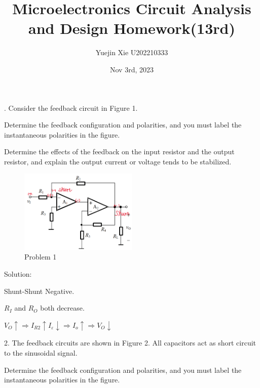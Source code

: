 \documentclass[a4paper,11pt,UTF8]{article}
\title{Microelectronics Circuit Analysis and Design Homework(13rd)}
\author{Yuejin Xie \quad U202210333}
\date{Nov 3rd, 2023}
\begin{document}
. Consider the feedback circuit in Figure 1.

 Determine the feedback configuration and polarities, and you must label the instantaneous polarities in the figure.

 Determine the effects of the feedback on the input resistor and the output resistor, and explain the output current or voltage tends to be stabilized.
\begin{figure}[H]
	\centering
	\includegraphics[width=0.5\textwidth]{12.1}
	\caption{Problem 1}
\end{figure}
\noindent Solution:

 Shunt-Shunt Negative. 

 $R_I$ and $R_O$ both decrease.

$V_O\uparrow\Rightarrow I_{R2}\uparrow I_{\varepsilon}\downarrow\Rightarrow I_o\uparrow\Rightarrow V_O\downarrow$

2. The feedback circuits are shown in Figure 2. All capacitors act as short circuit to the sinusoidal signal.

 Determine the feedback configuration and polarities, and you must label the instantaneous polarities in the figure.
\end{document}
